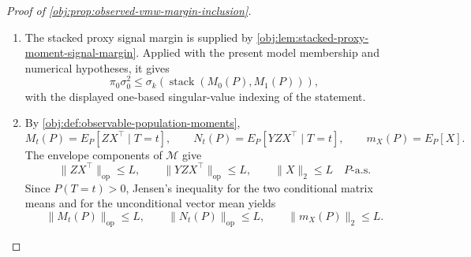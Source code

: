 \documentclass[11pt]{article}
\begin{document}
\begin{proof}[Proof of \cref{obj:prop:observed-vmw-margin-inclusion}]
\begin{enumerate}
\item The stacked proxy signal margin is supplied by
\cref{obj:lem:stacked-proxy-moment-signal-margin}.  Applied with the present model membership and numerical hypotheses, it gives
\[
\pi_0\sigma_0^2
\le
\sigma_k\!\left(\operatorname{stack}(M_0(P),M_1(P))\right),
\]
with the displayed one-based singular-value indexing of the statement.

\item By \cref{obj:def:observable-population-moments},
\[
M_t(P)=E_P[ZX^\top\mid T=t],
\qquad
N_t(P)=E_P[YZX^\top\mid T=t],
\qquad
m_X(P)=E_P[X].
\]
The envelope components of \(\mathcal M\) give
\[
\|ZX^\top\|_{\mathrm{op}}\le L,
\qquad
\|YZX^\top\|_{\mathrm{op}}\le L,
\qquad
\|X\|_2\le L
\quad P\text{-a.s.}
\]
Since \(P(T=t)>0\), Jensen's inequality for the two conditional matrix means and for the unconditional vector mean yields
\[
\|M_t(P)\|_{\mathrm{op}}\le L,
\qquad
\|N_t(P)\|_{\mathrm{op}}\le L,
\qquad
\|m_X(P)\|_2\le L .
\]


\end{enumerate}
\end{proof}
\end{document}
